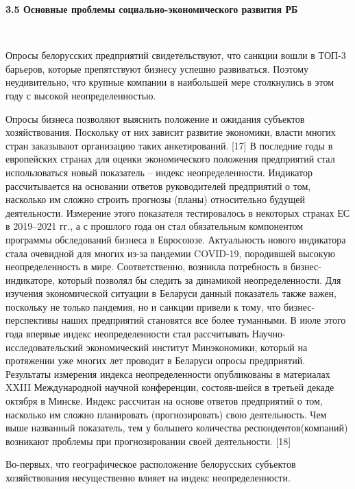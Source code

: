 \documentclass[14pt,a4paper]{article}
\begin{document}
    \newpage
    \begin{center}
        \textbf{3.5 Основные проблемы социально-экономического развития РБ}
    \end{center}
    \\
    \par
    Опросы белорусских предприятий свидетельствуют, что санкции вошли в ТОП-3 барьеров, которые препятствуют бизнесу успешно развиваться.
    Поэтому неудивительно, что крупные компании в наибольшей мере столкнулись в этом году с высокой неопределенностью.
    \par
    Опросы бизнеса позволяют выяснить положение и ожидания субъектов хозяйствования.
    Поскольку от них зависит развитие экономики, власти многих стран заказывают организацию таких анкетирований. [17]
    В последние годы в европейских странах для оценки экономического положения предприятий стал использоваться новый показатель – индекс неопределенности.
    Индикатор рассчитывается на основании ответов руководителей предприятий о том, насколько им сложно строить прогнозы (планы) относительно будущей деятельности.
    Измерение этого показателя тестировалось в некоторых странах ЕС в 2019–2021 гг., а с прошлого года он стал обязательным компонентом программы обследований бизнеса в Евросоюзе.
    Актуальность нового индикатора стала очевидной для многих из-за пандемии COVID-19, породившей высокую неопределенность в мире.
    Соответственно, возникла потребность в бизнес-индикаторе, который позволял бы следить за динамикой неопределенности.
    Для изучения экономической ситуации в Беларуси данный показатель также важен, поскольку не только пандемия, но и санкции привели к тому, что бизнес-перспективы наших предприятий становятся все более туманными.
    В июле этого года впервые индекс неопределенности стал рассчитывать Научно-исследовательский экономический институт Минэкономики, который на протяжении уже многих лет проводит в Беларуси опросы предприятий.
    Результаты измерения индекса неопределенности опубликованы в материалах XXIII Международной научной конференции, состояв-шейся в третьей декаде октября в Минске.
    Индекс рассчитан на основе ответов предприятий о том, насколько им сложно планировать (прогнозировать) свою деятельность.
    Чем выше названный показатель, тем у большего количества респондентов(компаний) возникают проблемы при прогнозировании своей деятельности. [18]
    \par
    Во-первых, что географическое расположение белорусских субъектов хозяйствования несущественно влияет на индекс неопределенности.
\end{document}
